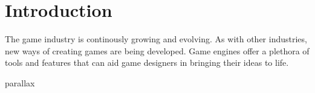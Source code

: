 
\chapter{Introduction}

The game industry is continously growing and evolving. 
As with other industries, new ways of creating games are being developed. 
Game engines offer a plethora of tools and features that can aid game designers in bringing their ideas to life.


\gls{parallax}
